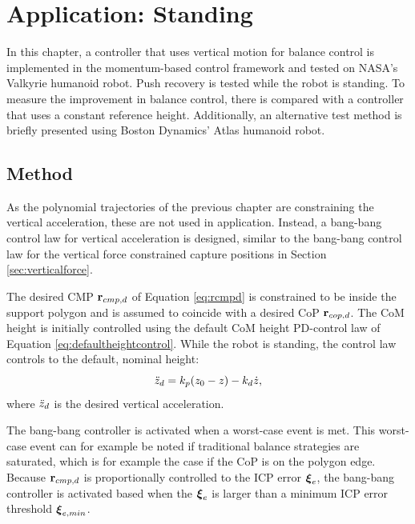 \chapter{Application: Standing}\label{chap:standing}
In this chapter, a controller that uses vertical motion for balance control is implemented in the momentum-based control framework and tested on NASA's Valkyrie \cite{radford2015valkyrie} humanoid robot. Push recovery is tested while the robot is standing. To measure the improvement in balance control, there is compared with a controller that uses a constant reference height. Additionally, an alternative test method is briefly presented using Boston Dynamics' Atlas humanoid robot.

\section{Method}
As the polynomial trajectories of the previous chapter are constraining the vertical acceleration, these are not used in application. Instead, a bang-bang control law for vertical acceleration is designed, similar to the bang-bang control law for the vertical force constrained capture positions in Section \ref{sec:verticalforce}.

The desired \ac{CMP} $\mathbf{r}_{cmp,d}$ of Equation \ref{eq:rcmpd} is constrained to be inside the support polygon and is assumed to coincide with a desired \ac{CoP} $\mathbf{r}_{cop,d}$. The \ac{CoM} height is initially controlled using the default \ac{CoM} height PD-control law of Equation \ref{eq:defaultheightcontrol}.  While the robot is standing, the control law controls to the default, nominal height:
\begin{equation}
\ddot{z}_d =k_p(z_0-z) - k_d\dot{z},
\end{equation}
where $\ddot{z}_d$ is the desired vertical acceleration. 

The bang-bang controller is activated when a worst-case event is met. This worst-case event can for example be noted if traditional balance strategies are saturated, which is for example the case if the \ac{CoP} is on the polygon edge. Because $\mathbf{r}_{cmp,d}$ is proportionally controlled to the \ac{ICP} error $\boldsymbol{\xi}_e$, the bang-bang controller is activated based when the $\boldsymbol{\xi}_e$ is larger than a minimum \ac{ICP} error threshold $\boldsymbol{\xi}_{e,min}$. 

